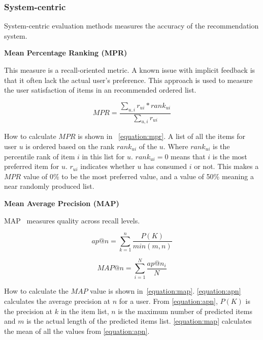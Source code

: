 \subsubsection{System-centric}
System-centric evaluation methods measures the accuracy of the recommendation system.





\textbf{Mean Percentage Ranking (MPR)}

This measure is a recall-oriented metric.
A known issue with implicit feedback is that it often lack the actual user's preference.
This approach is used to measure the user satisfaction of items in an recommended ordered list.

\begin{equation}
	MPR = \frac{\sum_{u,i}{r_{ui} * rank_{ui}}}{\sum_{u,i}{r_{ui}}}
	\label{equation:mpr}
\end{equation}

How to calculate $MPR$ is shown in ~\ref{equation:mpr}.
A list of all the items for user $u$ is ordered based on the rank $rank_{ui}$ of the $u$.
Where $rank_{ui}$ is the percentile rank of item $i$ in this list for $u$.
$rank_{ui} = 0$ means that $i$ is the most preferred item for $u$.
$r_{ui}$ indicates whether $u$ has consumed $i$ or not.
This makes a $MPR$ value of 0\% to be the most preferred value, and a value of 50\% meaning a near randomly produced list.


\textbf{Mean Average Precision (MAP)}

MAP~\cite{Manning:2008:IIR:1394399} measures quality across recall levels.


\begin{equation}
	ap@n = \sum_{k=1}^{n}{\frac{P(K)}{min(m,n)}}
	\label{equation:apn}
\end{equation}

\begin{equation}
	MAP@n = \sum_{i=1}^{N}{\frac{ap@n_i}{N}}
	\label{equation:map}
\end{equation}

How to calculate the $MAP$ value is shown in~\ref{equation:map}.
\ref{equation:apn} calculates the average precision at $n$ for a user.
From \ref{equation:apn}, $P(K)$ is the precision at $k$ in the item list, $n$ is the maximum number of predicted items and $m$ is the actual length of the predicted items list.
\ref{equation:map} calculates the mean of all the values from \ref{equation:apn}.


